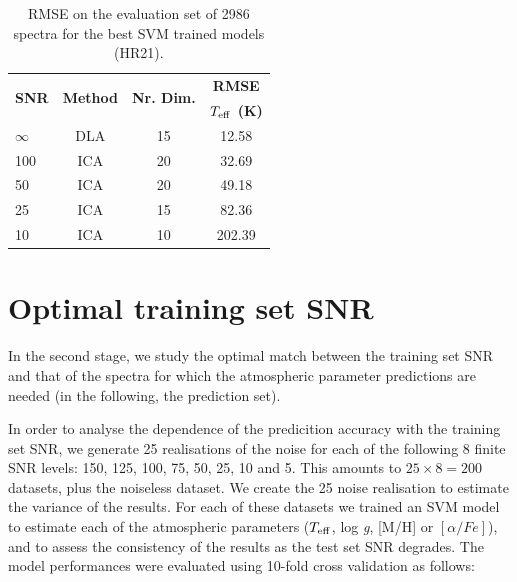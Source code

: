 \documentclass[a4paper,fleqn,usenatbib]{mnras}
\begin{document}
{{{\begin{table}
\centering
\caption{RMSE on the evaluation set of 2986 spectra for the best SVM trained models (HR21).}
\label{tab:hr21}
\begin{tabular}{l c c c}
\hline
\multirow{2}{*}{\textbf{SNR}} & \multirow{2}{*}{\textbf{Method}} & \multirow{2}{*}{\textbf{Nr. Dim.}} & {\bf RMSE}\\
 &  &  & \textbf{$T_{\rm eff}$ (K)}\\
\hline
$\infty$ & DLA & 15 & 12.58\\
100 & ICA & 20 & 32.69\\
50 & ICA & 20 & 49.18\\
25 & ICA & 15 & 82.36\\
10 & ICA & 10 & 202.39\\
\hline
\end{tabular}
\end{table}

\section{Optimal training set SNR}
\label{sec:comparison2}

In the second stage, we study the optimal match between the training
set SNR and that of the spectra for which the atmospheric parameter
predictions are needed (in the following, the prediction set).

In order to analyse the dependence of the predicition accuracy with
the training set SNR, we generate 25 realisations of the noise for
each of the following 8 finite SNR levels: 150, 125, 100, 75, 50, 25,
10 and 5. This amounts to $25\times 8=200$ datasets, plus the
noiseless dataset. We create the 25 noise realisation to estimate the
variance of the results. For each of these datasets we trained an SVM
model to estimate each of the atmospheric parameters ($T_{\rm
  eff}$, log \textit{g}, [M/H] or $\left[ \alpha/Fe \right]$), and to 
assess the consistency of the results as the test set SNR degrades. 
The model performances were evaluated using 10-fold cross validation 
as follows:

}}}
\end{document}
